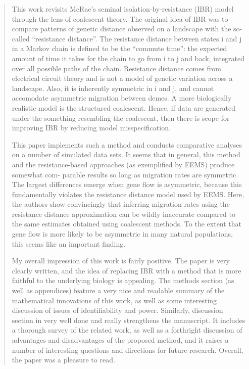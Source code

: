 \begin{quote}
    This work revisits McRae’s seminal isolation-by-resistance (IBR) model through
    the lens of coalescent theory. The original idea of IBR was to compare patterns of
    genetic distance observed on a landscape with the so-called ``resistance distance''.
    The resistance distance between states i and j in a Markov chain is defined to be
    the ``commute time'': the expected amount of time it takes for the chain to go
    from i to j and back, integrated over all possible paths of the chain. Resistance
    distance comes from electrical circuit theory and is not a model of genetic
    variation across a landscape. Also, it is inherently symmetric in i and j, and
    cannot accomodate asymmetric migration between demes. A more biologically
    realistic model is the structured coalescent. Hence, if data are generated under
    the something resembling the coalescent, then there is scope for improving IBR
    by reducing model misspecification.

    This paper implements such a method and conducts comparative analyses on a
    number of simulated data sets. It seems that in general, this method and the
    resistance-based approaches (as exemplified by EEMS) produce somewhat com-
    parable results so long as migration rates are symmetric. The largest differences
    emerge when gene flow is asymmetric, because this fundamentally violates the
    resistance distance model used by EEMS. Here, the authors show convincingly
    that inferring migration rates using the resistance distance approximation can
    be wildly inaccurate compared to the same estimates obtained using coalescent
    methods. To the extent that gene flow is more likely to be asymmetric in many
    natural populations, this seems like an important finding.

    My overall impression of this work is fairly positive. The paper is very clearly
    written, and the idea of replacing IBR with a method that is more faithful to
    the underlying biology is appealing. The methods section (as well as appendices)
    feature a very nice and readable summary of the mathematical innovations of
    this work, as well as some interesting discussion of issues of identifiability and
    power. Similarly, discussion section in very well done and really strengthens
    the manuscript. It includes a thorough survey of the related work, as well as a
    forthright discussion of advantages and disadvantages of the proposed method,
    and it raises a number of interesting questions and directions for future research.
    Overall, the paper was a pleasure to read.


\end{quote}
